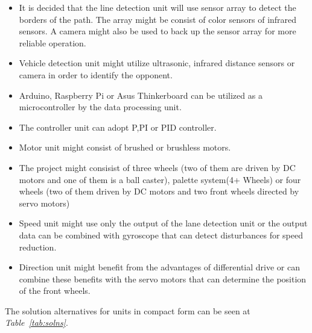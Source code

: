 \documentclass[a4paper,12pt]{article}
\begin{document}
	\begin{itemize}
		\item It is decided that the line detection unit will use sensor array to detect the borders of the path. The array might be consist of color sensors of infrared sensors. A camera might also be used to back up the sensor array for more reliable operation.	
		\item Vehicle detection unit might utilize ultrasonic, infrared distance sensors or camera in order to identify the opponent.
		\item  Arduino, Raspberry Pi or Asus Thinkerboard can be utilized as a microcontroller by the data processing unit.
		\item The controller unit can adopt P,PI or PID controller.
		\item Motor unit might consist of brushed or brushless motors.
		\item The project might consisist of three wheels (two of them are driven by DC motors and one of them is a ball caster), palette system(4+ Wheels) or four wheels (two of them driven by DC motors and two front wheels directed by servo motors)
		\item Speed unit might use only the output of the lane detection unit or the output data can be combined with gyroscope that can detect disturbances for speed reduction.  
		\item Direction unit might benefit from the advantages of differential drive or can combine these benefits with the servo motors that can determine the position of the front wheels.
	\end{itemize}	  
			
		The solution alternatives for units in compact form can be seen at \textit{Table~\ref{tab:solns}}.
	
\end{document}
